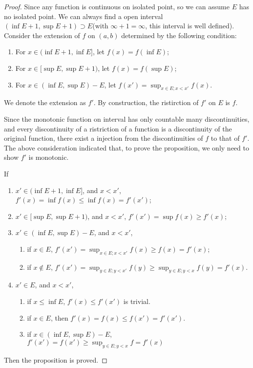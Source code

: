 \documentclass[lang=en, 12pt]{elegantbook}
\begin{document}
        \begin{proof}
            Since any function is continuous on isolated point, so we can assume $E$ has no isolated point. We can always find a open 
        interval $(\inf E+1, \sup E+1) \supset E$(with $\infty +1 = \infty$, this interval is well defined). Consider the extension of 
        $f$ on $(a, b)$ determined by the following condition:
        \begin{enumerate}
            \item For $x \in (\inf E +1, \inf E]$, let $f(x) = f(\inf E)$; 
            \item For $x \in [\sup E, \sup E +1)$, let $f(x) = f(\sup E)$; 
            \item For $x \in(\inf E, \sup E) - E$, let $f(x') = \sup_{x \in E; x<x'} f(x)$. 
        \end{enumerate}
            We denote the extension as $f'$. By construction, the ristirction of $f'$ on $E$ is $f$.  \par
            Since the monotonic function on interval has only countable many discontinuities, and every discontinuity of a ristriction of 
        a function is a discontinuity of the original function, there exist a injection from the discontinuities of $f$ to that of $f'$.
        The above consideration indicated that, to prove the proposition, we only need to show $f'$ is monotonic.\par
            If
            \begin{enumerate} 
                \item  $x' \in (\inf E +1, \inf E]$, and $x<x'$, $f'(x)= \inf f(x) \leq \inf f(x) =f'(x')$; 
                \item  $x' \in [\sup E, \sup E +1)$, and $x<x'$, $f'(x') = \sup f(x) \geq f'(x)$; 
                \item  $x' \in(\inf E, \sup E) - E$, and $x<x'$, 
                \begin{enumerate}
                    \item if $x\in E$, $f'(x') = \sup_{x \in E; x<x'} f(x) \geq f(x) = f'(x)$;
                    \item if $x \notin E$, $f'(x') = \sup_{y \in E ;y<x'} f(y) \geq \sup_{y \in E ;y<x} f(y) = f'(x)$. 
                \end{enumerate}
                \item  $x' \in E$, and $x<x'$, 
                \begin{enumerate}
                    \item if $x \leq \inf E$, $f'(x) \leq f'(x')$ is trivial.
                    \item if $x \in E$, then $f'(x) = f(x) \leq f(x') = f'(x')$.
                    \item if $x \in (\inf E, \sup E) - E$, $f'(x') = f(x') \geq \sup_{y \in E; y<x} f = f'(x)$
                \end{enumerate}
            \end{enumerate}
            Then the proposition is proved.
        \end{proof}
\end{document}
